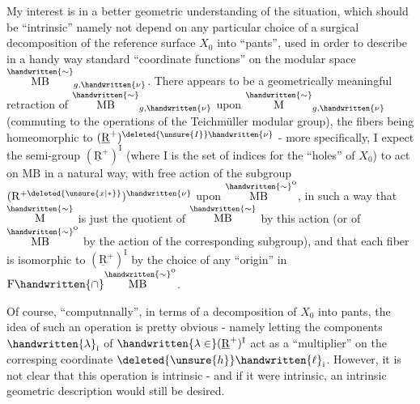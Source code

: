My interest is in a better geometric understanding of the situation, which should be ``intrinsic'' namely not depend on any particular choice of a surgical decomposition of the reference surface $X_0$ into ``pants'', used in order to describe in a handy way  standard ``coordinate functions'' on the modular space $\overset{\handwritten{\sim}}{\mathrm{MB}}_{g,\handwritten{\nu}}$. There appears to be a geometrically meaningful retraction of $\overset{\handwritten{\sim}}{\mathrm{MB}}_{g,\handwritten{\nu}}$  upon $\overset{\handwritten{\sim}}{\mathrm M}_{g,\handwritten{\nu}}$ (commuting to the operations of the Teichmüller modular group), the fibers being homeomorphic to $(\underline{\mathrm R}^{+})^{\deleted{\unsure{I}}\handwritten{\nu}}$ - more specifically, I expect the semi-group $(\underline{\mathrm R}^+)^{\mathrm I}$ (where I is the set of indices for the ``holes'' of $X_0$) to act on $\mathrm{MB}$ in a natural way, with free action of the subgroup $(\mathrm R^{+\deleted{\unsure{x|*}}})^{\handwritten{\nu}}$ upon $\overset{\handwritten{\sim}}{\mathrm{MB}}^{\mathrm o}$, in such a way that $\overset{\handwritten{\sim}}{\mathrm M}$ is just the quotient of $\overset{\handwritten{\sim}}{\mathrm{MB}}$ by this action (or of $\overset{\handwritten{\sim}}{\mathrm{MB}}^{\mathrm o}$ by the action of the  corresponding subgroup), and that each fiber  is isomorphic to $(\underline{\mathrm R}^+)^{\mathrm I}$ by the choice of any ``origin'' in $\mathrm F\handwritten{\cap}\overset{\handwritten{\sim}}{\mathrm{MB}}^{\mathrm o}$.

Of course, ``computnnally'', in terms of a decomposition of $X_0$ into pants, the idea of such an operation is pretty obvious - namely letting the components $\handwritten{\lambda}_{\mathrm i}$ of $\handwritten{\lambda\in}(\underline{\mathrm R}^+)^{\mathrm I}$ act as a ``multiplier'' on the corresping coordinate $\deleted{\unsure{h}}\handwritten{\ell}_{\mathrm i}$. However, it is not clear that this operation is intrinsic - and if it were intrinsic, an intrinsic geometric description would still be  desired.

